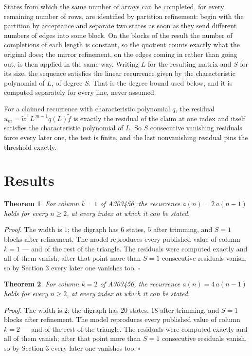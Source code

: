 \documentclass[11pt]{article}
\newtheorem{theorem}{Theorem}
\theoremstyle{definition}
\begin{document}
States from which the same number of arrays can be completed, for every remaining number of rows, are identified by partition refinement: begin with the partition by acceptance and separate two states as soon as they send different numbers of edges into some block. On the blocks of the result the number of completions of each length is constant, so the quotient counts exactly what the original does; the mirror refinement, on the edges coming in rather than going out, is then applied in the same way. Writing $L$ for the resulting matrix and $S$ for its size, the sequence satisfies the linear recurrence given by the characteristic polynomial of $L$, of degree $S$. That is the degree bound used below, and it is computed separately for every line, never assumed.

For a claimed recurrence with characteristic polynomial $q$, the residual $u_m = \tilde w^{\mathsf T}L^{\,m-1}q(L)\tilde f$ is exactly the residual of the claim at one index and itself satisfies the characteristic polynomial of $L$. So $S$ consecutive vanishing residuals force every later one, the test is finite, and the last nonvanishing residual pins the threshold exactly.

\section{Results}

\begin{theorem} For column $k = 1$ of A303456, the recurrence $a(n) = 2\,a(n-1)$ holds for every $n \ge 2$, at every index at which it can be stated.\end{theorem}

{\itshape Proof.} The width is $1$; the digraph has $6$ states, $5$ after trimming, and $S = 1$ blocks after refinement. The model reproduces every published value of column $k = 1$ --- and of the rest of the triangle. The residuals were computed exactly and all of them vanish; after that point more than $S = 1$ consecutive residuals vanish, so by Section 3 every later one vanishes too. $\square$

\begin{theorem} For column $k = 2$ of A303456, the recurrence $a(n) = 4\,a(n-1)$ holds for every $n \ge 2$, at every index at which it can be stated.\end{theorem}

{\itshape Proof.} The width is $2$; the digraph has $20$ states, $18$ after trimming, and $S = 1$ blocks after refinement. The model reproduces every published value of column $k = 2$ --- and of the rest of the triangle. The residuals were computed exactly and all of them vanish; after that point more than $S = 1$ consecutive residuals vanish, so by Section 3 every later one vanishes too. $\square$
\end{document}
